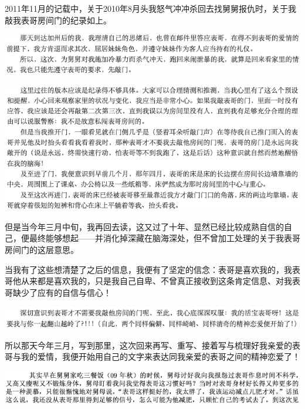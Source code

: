 \documentclass[9pt, b5paper]{article}
\begin{document}
2011年11月的记载中，关于2010年8月头我怒气冲冲杀回去找舅舅报仇时，关于我敲我表哥房间门的纪录如上。 

\begin{center}
\includegraphics[width=.9\linewidth]{./pic/backups_plans_20210426_161859.png}
\end{center}

\begin{center}
\includegraphics[width=.9\linewidth]{./pic/backups_plans_20210426_161924.png}
\end{center}

但是当今年三月中旬，我再回去读，这又过了十年、显然已经比较成熟自信的自己，便最终能够想起——并消化掉深藏在脑海深处，但不曾加工处理的关于我表哥房间门的这层意思。

当我有了这些想清楚了之后的信息，我便有了坚定的信念：表哥是喜欢我的，我表哥他从来都是喜欢我的，只是我自己自卑、不曾真正接收到这条肯定信息、对我表哥缺少了应有的自信与信心！

\begin{center}
\includegraphics[width=.9\linewidth]{./pic/backups_plans_20210426_162149.png}
\end{center}

所以那天今年三月，写到那里，这次回来再写、重写、接着写与梳理好我亲爱的表哥与我的爱情，我便开始用自己的文字来表达同我亲爱的表哥之间的精神恋爱了！

\begin{center}
\includegraphics[width=.9\linewidth]{./pic/backups_plans_20210426_162643.png}
\end{center}
\end{document}
